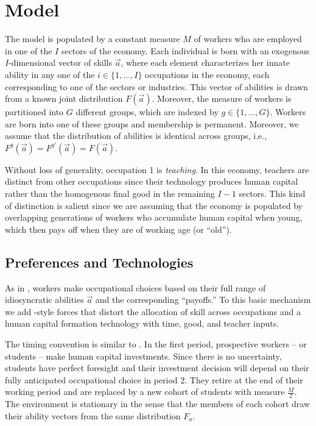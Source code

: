 \documentclass[onehalfspacing,11pt]{article}
\begin{document}
\section{Model}\label{sec:model}
The model is populated by a constant measure $M$ of workers who are employed in one of the $I$ sectors of the economy. Each individual is born with an exogenous $I$-dimensional vector of skills $\vec{a}$, where each element characterizes her innate ability in any one of the $i \in \{1,\ldots,I\}$ occupations in the economy, each corresponding to one of the sectors or industries. This vector of abilities is drawn from a known joint distribution $F(\vec{a})$. Moreover, the measure of workers is partitioned into $G$ different groups, which are indexed by $g \in \{1,\dots,G \}$. Workers are born into one of these groups and membership is permanent. Moreover, we assume that the distribution of abilities is identical across groups, i.e., $F^g(\vec{a}) = F^{g'}(\vec{a}) = F(\vec{a})$.

Without loss of generality, occupation 1 is \textit{teaching}. In this economy, teachers are distinct from other occupations since their technology produces human capital rather than the homogenous final good in the remaining $I-1$ sectors. This kind of distinction is salient since we are assuming that the economy is populated by overlapping generations of workers who accumulate human capital when young, which then pays off when they are of working age (or ``old'').
\subsection{Preferences and Technologies}\label{sec:workers}
As in \cite{Roy:1951}, workers make occupational choices based on their full range of idiosyncratic abilities $\vec{a}$ and the corresponding ``payoffs.'' To this basic mechanism we add \cite{Hsieh:2019}-style forces that distort the allocation of skill across occupations and a human capital formation technology with time, good, and teacher inputs.

The timing convention is similar to \cite{Hsieh:2019}. In the first period, prospective workers -- or students -- make human capital investments. Since there is no uncertainty, students have perfect foresight and their investment decision will depend on their fully anticipated occupational choice in period 2. They retire at the end of their working period and are replaced by a new cohort of students with measure $\tfrac{M}{2}$. The environment is stationary in the sense that the members of each cohort draw their ability vectors from the same distribution $F_a$.
\end{document}
